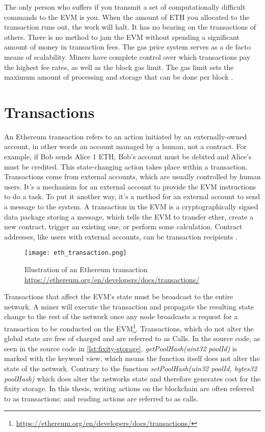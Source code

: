 The only person who suffers if you transmit a set of computationally difficult commands to the EVM is you. When the amount of ETH you allocated to the transaction runs out, the work will halt. It has no bearing on the transactions of others. There is no method to jam the EVM without spending a significant amount of money in transaction fees. The gas price system serves as a de facto means of scalability. Miners have complete control over which transactions pay the highest fee rates, as well as the block gas limit. The gas limit sets the maximum amount of processing and storage that can be done per block \cite[60]{dannen2017introducing}. 
\section{Transactions}\label{sec:tx-cost}
An Ethereum transaction refers to an action initiated by an externally-owned account, in other words an account managed by a human, not a contract. For example, if Bob sends Alice 1 ETH, Bob's account must be debited and Alice's must be credited. This state-changing action takes place within a transaction. 
Transactions come from external accounts, which are usually controlled by human users. It's a mechanism for an external account to provide the EVM instructions to do a task. To put it another way, it's a method for an external account to send a message to the system. A transaction in the EVM is a cryptographically signed data package storing a message, which tells the EVM to transfer ether, create a new contract, trigger an existing one, or perform some calculation. Contract addresses, like users with external accounts, can be transaction recipients \cite[60]{dannen2017introducing}. 
\begin{figure}[h]
    \caption{Illustration of an Ethereum transaction \url{https://ethereum.org/en/developers/docs/transactions/}}
    \centering
    \texttt{[image: eth\_transaction.png]}
\end{figure}
Transactions that affect the EVM's state must be broadcast to the entire network. A miner will execute the transaction and propagate the resulting state change to the rest of the network once any node broadcasts a request for a transaction to be conducted on the EVM\footnote{\url{https://ethereum.org/en/developers/docs/transactions/}}.
Transactions, which do not alter the global state are free of charged and are referred to as Calls. In the source code, as seen in the source code in \ref{lst:fixity-storage}, \textit{getPoolHash(uint32 poolId)} is marked with the keyword view, which means the function itself does not alter the state of the network. Contrary to the function \textit{setPoolHash(uin32 poolId, bytes32 poolHash)} which does alter the networks state and therefore generates cost for the fixity storage. In this thesis, writing actions on the blockchain are often referred to as transactions; and reading actions are referred to as calls.
